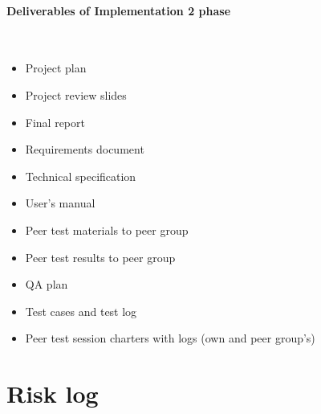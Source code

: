 \paragraph{Deliverables of Implementation 2 phase}~
\begin{itemize}
  \item Project plan
  \item Project review slides
  \item Final report
  \item Requirements document
  \item Technical specification
  \item User's manual 
  \item Peer test materials to peer group
  \item Peer test results to peer group
  \item QA plan
  \item Test cases and test log
  \item Peer test session charters with logs (own and peer group's)
\end{itemize}

\section{Risk log}

